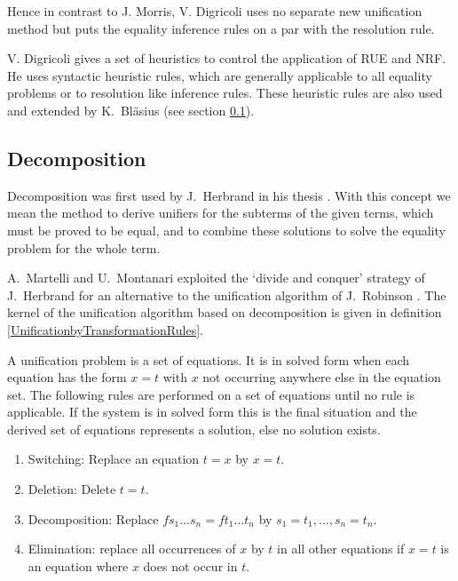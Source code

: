 Hence in contrast to J. Morris, V. Digricoli uses no
separate new unification method but puts the equality
inference rules on a par with the resolution
rule.

V. Digricoli \cite{Digricoli85} gives a set of heuristics to control 
the application of RUE and NRF.
He uses syntactic heuristic 
rules, which are generally applicable to all 
equality problems or to resolution 
like inference rules. These heuristic rules are also used and 
extended by K.\ Bl\"asius (see section \ref{Decomposition}).


\subsection{Decomposition}
\label{Decomposition}

Decomposition was first used 
by J.\ Herbrand in his thesis \cite{Herbrand30}.
With this concept we mean the method to derive unifiers
for the subterms of the given terms, which must be proved to be equal, and to combine these solutions to
solve the equality problem for the whole term.


A.\ Martelli and U.\ Montanari
\cite{MaMo82} exploited the `divide and conquer' strategy of J.\ Herbrand
for an
alternative to the unification algorithm of J.\ Robinson \cite{Robinson65a}.
The kernel of the unification algorithm based on decomposition is given in 
definition \ref{UnificationbyTransformationRules}.

\begin{Def}

\label{UnificationbyTransformationRules}
\return
A unification problem is a set of equations.
It is in solved form when each equation has
the form $x=t$ with $x$ not occurring anywhere
else in the equation set.
The following rules are performed on a set of equations
until no rule is applicable. If the system is in 
solved form this is the final situation and the derived set of
equations represents a solution, else no solution exists.


\begin{enumerate}
\item Switching: Replace an equation $t=x$ by $x=t$.

\item Deletion: Delete $t=t$.

\item Decomposition: Replace 
$fs_1\ldots s_n=ft_1\ldots t_n$ by $s_1=t_1, \ldots,
s_n=t_n$.

\item Elimination: replace all occurrences of $x$
by $t$ in all other equations if $x=t$ is an equation
where $x$ does not occur in $t$.
\end{enumerate}
\end{Def}

